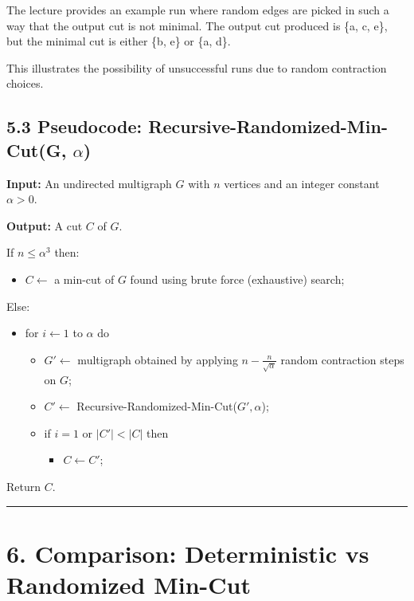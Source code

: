 \documentclass[12pt]{article}
\begin{document}
The lecture provides an example run where random edges are picked in such a way that the output cut is not minimal. The output cut produced is \{a, c, e\}, but the minimal cut is either \{b, e\} or \{a, d\}.

This illustrates the possibility of unsuccessful runs due to random contraction choices.

\subsection*{5.3 Pseudocode: Recursive-Randomized-Min-Cut(G, $\alpha$)}

\textbf{Input:}  
An undirected multigraph \( G \) with \( n \) vertices and an integer constant \( \alpha > 0 \).

\textbf{Output:}  
A cut \( C \) of \( G \).

If \( n \le \alpha^3 \) then:

\begin{itemize}
    \item \( C \leftarrow \) a min-cut of \( G \) found using brute force (exhaustive) search;
\end{itemize}

Else:

\begin{itemize}
    \item for \( i \leftarrow 1 \) to \( \alpha \) do
    \begin{itemize}
        \item \( G' \leftarrow \) multigraph obtained by applying \( n - \frac{n}{\sqrt{\alpha}} \) random contraction steps on \( G \);
        \item \( C' \leftarrow \) Recursive-Randomized-Min-Cut(\( G', \alpha \));
        \item if \( i = 1 \) or \( |C'| < |C| \) then
        \begin{itemize}
            \item \( C \leftarrow C' \);
        \end{itemize}
    \end{itemize}
\end{itemize}

Return \( C \).

\hrule
\vspace{0.5cm}

\section*{6. Comparison: Deterministic vs Randomized Min-Cut}
\end{document}
